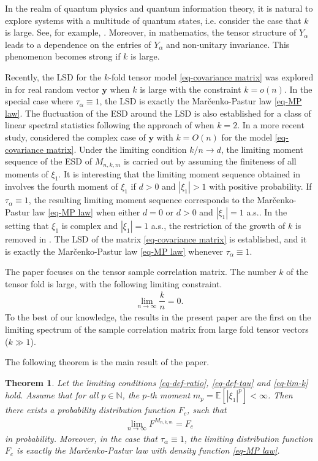 \documentclass[12pt]{article}
\numberwithin{equation}{section} \theoremstyle{plain}
\newtheorem{theorem}{Theorem}[section]
\def\bE{\mathbb E}
\def\bN{\mathbb N}
\def\y{\mathbf y}
\begin{document}
In the realm of quantum physics and quantum information theory, it is natural to explore systems with a multitude of quantum states, i.e. consider the case that $k$ is large. See, for example, \cites{Collins2011,Collins2013}.
Moreover, in mathematics, the tensor structure of $Y_\alpha$ leads to a dependence on the entries of $Y_\alpha$ and non-unitary invariance. This phenomenon becomes strong if $k$ is large.

Recently, the LSD for the $k$-fold tensor model \eqref{eq-covariance matrix} was explored in \cite{Lytova2018} for real random vector $\y$ when $k$ is large with the constraint $k = o(n)$. In the special case where $\tau_{\alpha} \equiv 1$, the LSD is exactly the Mar\v{c}enko-Pastur law \eqref{eq-MP law}. The fluctuation of the ESD around the LSD is also established for a class of linear spectral statistics following the approach of \cite{LytovaPastur09} when $k=2$.
In a more recent study, \cite{BYY2022} considered the complex case of $\y$ with $k = O(n)$ for the model \eqref{eq-covariance matrix}. Under the limiting condition $k/n \to d$, the limiting moment sequence of the ESD of $M_{n,k,m}$ is carried out by assuming the finiteness of all moments of $\xi_1$.
It is interesting that the limiting moment sequence obtained in \cite{BYY2022} involves the fourth moment of $\xi_1$ if $d>0$ and $|\xi_1|>1$ with positive probability. If $\tau_{\alpha} \equiv 1$, the resulting limiting moment sequence corresponds to the Mar\v{c}enko-Pastur law \eqref{eq-MP law} when either $d=0$ or $d>0$ and $|\xi_1|=1$ a.s..
In the setting that $\xi_1$ is complex and $|\xi_1|=1$ a.s., the restriction of the growth of $k$ is removed in \cite{Yuan2024}. The LSD of the matrix \eqref{eq-covariance matrix} is established, and it is exactly the Mar\v{c}enko-Pastur law \eqref{eq-MP law} whenever $\tau_{\alpha} \equiv 1$.

The paper focuses on the tensor sample correlation matrix. The number $k$ of the tensor fold is large, with the following limiting constraint.
\begin{align} \label{eq-lim-k}
    \lim_{n \to \infty} \dfrac{k}{n} = 0.
\end{align}
To the best of our knowledge, the results in the present paper are the first on the limiting spectrum of the sample correlation matrix from large fold tensor vectors ($k \gg 1$).

The following theorem is the main result of the paper.

\begin{theorem} \label{Thm}
Let the limiting conditions \eqref{eq-def-ratio}, \eqref{eq-def-tau} and \eqref{eq-lim-k} hold. Assume that for all $p \in \bN$, the $p$-th moment $m_p = \bE [|\xi_1|^p] < \infty$. Then there exists a probability distribution function $F_c$, such that
\begin{align*}
    \lim_{n \to \infty} F^{M_{n,k,m}} = F_c
\end{align*}
in probability.
Moreover, in the case that $\tau_\alpha \equiv 1$, the limiting distribution function $F_c$ is exactly the Mar\v{c}enko-Pastur law with density function \eqref{eq-MP law}.
\end{theorem}
\end{document}
